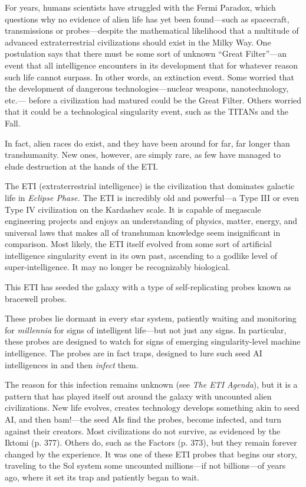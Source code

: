 For years, humans scientists have struggled with the Fermi Paradox, which questions why no evidence of alien life has yet been found—such as spacecraft, transmissions or probes—despite the mathematical likelihood that a multitude of advanced extraterrestrial civilizations should exist in the Milky Way. One postulation says that there must be some sort of unknown ``Great Filter''—an event that all intelligence encounters in its development that for whatever reason such life cannot surpass. In other words, an extinction event. Some worried that the development of dangerous technologies—nuclear weapons, nanotechnology, etc.— before a civilization had matured could be the Great Filter. Others worried that it could be a technological singularity event, such as the TITANs and the Fall. 

In fact, alien races do exist, and they have been around for far, far longer than transhumanity. New ones, however, are simply rare, as few have managed to elude destruction at the hands of the ETI. 

The ETI (extraterrestrial intelligence) is the civilization that dominates galactic life in \textit{Eclipse Phase.} The ETI is incredibly old and powerful—a Type III or even Type IV civilization on the Kardashev scale. It is capable of megascale engineering projects and enjoys an understanding of physics, matter, energy, and universal laws that makes all of transhuman knowledge seem insignificant in comparison. Most likely, the ETI itself evolved from some sort of artificial intelligence singularity event in its own past, ascending to a godlike level of super-intelligence. It may no longer be recognizably biological. 

This ETI has seeded the galaxy with a type of self-replicating probes known as bracewell probes. 

These probes lie dormant in every star system, patiently waiting and monitoring for \textit{millennia} for signs of intelligent life—but not just any signs. In particular, these probes are designed to watch for signs of emerging singularity-level machine intelligence. The probes are in fact traps, designed to lure such seed AI intelligences in and then \textit{infect} them. 

The reason for this infection remains unknown (see \textit{The ETI Agenda}), but it is a pattern that has played itself out around the galaxy with uncounted alien civilizations. New life evolves, creates technology develops something akin to seed AI, and then bam!—the seed AIs find the probes, become infected, and turn against their creators. Most civilizations do not survive, as evidenced by the Iktomi (p. 377). Others do, such as the Factors (p. 373), but they remain forever changed by the experience. It was one of these ETI probes that begins our story, traveling to the Sol system some uncounted millions—if not billions—of years ago, where it set its trap and patiently began to wait. 



